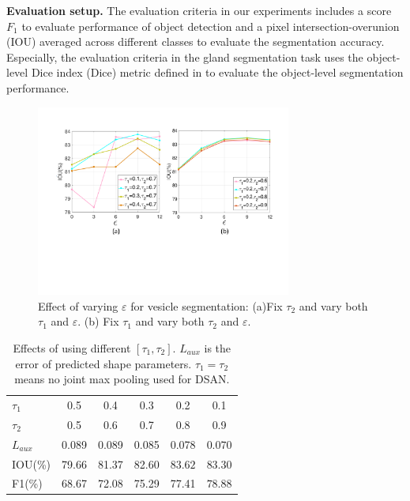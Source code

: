 \noindent\textbf{Evaluation setup.}
%
The evaluation criteria in our experiments includes a score $F_1$ \cite{Chen2016a} to evaluate performance of object detection and a pixel intersection-overunion (IOU) averaged across different classes \cite{Chen2014a} to evaluate the segmentation accuracy.
Especially, the evaluation criteria in the gland segmentation task uses the object-level Dice index (Dice) metric defined in \cite{Chen2016a} to evaluate the object-level segmentation performance.
\begin{figure}
    \begin{center}
        \includegraphics[width=3.3in]{figures/FigVar.pdf}
    \end{center}
    \caption{Effect of varying $\varepsilon$ for vesicle segmentation: (a)Fix $\tau_2$ and vary both $\tau_1$ and $\varepsilon$. (b) Fix $\tau_1$ and vary both $\tau_2$ and $\varepsilon$.}
    \label{FigVar}
\end{figure}

\begin{table}
\begin{center}
\begin{tabular}{l|ccccc}
\hline
$\tau_1$ & 0.5 & 0.4 & 0.3 & 0.2 & 0.1 \\
$\tau_2$ & 0.5 & 0.6 & 0.7 & 0.8 & 0.9 \\
\hline
$L_{aux}$&0.089&0.089&0.085&0.078&$\mathbf{0.070}$\\
\hline
IOU(\%)&79.66& 81.37&82.60&$\mathbf{83.62}$ & 83.30\\
\hline
F1(\%)&68.67&72.08&75.29&77.41&$\mathbf{78.88}$\\
\hline
\end{tabular}
\end{center}
\caption{Effects of using different $[\tau_1,\tau_2]$.
        $L_{aux}$ is the error of predicted shape parameters.
        $\tau_1=\tau_2$ means no joint max pooling used for DSAN.}
\label{tab:var}
\end{table}

